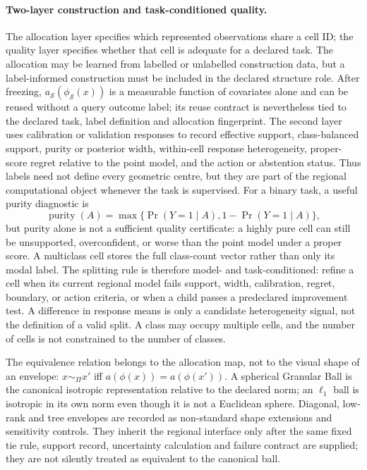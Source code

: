 \documentclass[11pt,a4paper]{article}
\numberwithin{equation}{section}
\theoremstyle{definition}\newtheorem{definition}[theorem]{Definition}
\theoremstyle{remark}\newtheorem{remark}[theorem]{Remark}
\begin{document}
\paragraph{Two-layer construction and task-conditioned quality.}
The allocation layer specifies which represented observations share a cell ID; the quality layer specifies whether that cell is adequate for a declared task. The allocation may be learned from labelled or unlabelled construction data, but a label-informed construction must be included in the declared structure role. After freezing, $a_{\mathcal S}(\phi_{\mathcal S}(x))$ is a measurable function of covariates alone and can be reused without a query outcome label; its reuse contract is nevertheless tied to the declared task, label definition and allocation fingerprint. The second layer uses calibration or validation responses to record effective support, class-balanced support, purity or posterior width, within-cell response heterogeneity, proper-score regret relative to the point model, and the action or abstention status. Thus labels need not define every geometric centre, but they are part of the regional computational object whenever the task is supervised. For a binary task, a useful purity diagnostic is
\[
\operatorname{purity}(A)=\max\{\Pr(Y=1\mid A),1-\Pr(Y=1\mid A)\},
\]
but purity alone is not a sufficient quality certificate: a highly pure cell can still be unsupported, overconfident, or worse than the point model under a proper score. A multiclass cell stores the full class-count vector rather than only its modal label. The splitting rule is therefore model- and task-conditioned: refine a cell when its current regional model fails support, width, calibration, regret, boundary, or action criteria, or when a child passes a predeclared improvement test. A difference in response means is only a candidate heterogeneity signal, not the definition of a valid split. A class may occupy multiple cells, and the number of cells is not constrained to the number of classes.

The equivalence relation belongs to the allocation map, not to the visual shape of an envelope: $x\sim_\Pi x'$ iff $a(\phi(x))=a(\phi(x'))$. A spherical Granular Ball is the canonical isotropic representation relative to the declared norm; an $\ell_1$ ball is isotropic in its own norm even though it is not a Euclidean sphere. Diagonal, low-rank and tree envelopes are recorded as non-standard shape extensions and sensitivity controls. They inherit the regional interface only after the same fixed tie rule, support record, uncertainty calculation and failure contract are supplied; they are not silently treated as equivalent to the canonical ball.
\end{document}
